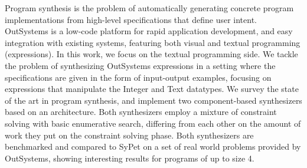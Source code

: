 Program synthesis is the problem of automatically generating concrete program
implementations from high-level specifications that define user intent.
OutSystems is a low-code platform for rapid application development,
and easy integration with existing systems, featuring both visual and
textual programming (expressions).
In this work, we focus on the textual programming side.
We tackle the problem of synthesizing OutSystems expressions in a setting where
the specifications are given in the form of input-output examples, focusing on
expressions that manipulate the Integer and Text datatypes.
We survey the state of the art in program synthesis, and implement two
component-based  synthesizers based on an 
architecture.
Both synthesizers employ a mixture of constraint solving with basic enumerative
search, differing from each other on the amount of work they put on the
constraint solving phase.
Both synthesizers are benchmarked and compared to SyPet on a set of real world
problems provided by OutSystems, showing interesting results for programs of up
to size 4.